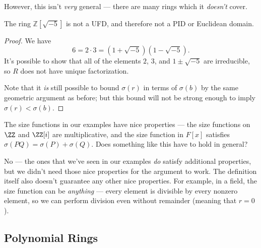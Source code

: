 However, this isn't \emph{very} general --- there are many rings which it \emph{doesn't} cover. 


\begin{example}
    The ring $\mathbb{Z}[\sqrt{-5}]$ is not a UFD, and therefore not a PID or Euclidean domain. 
\end{example}

\begin{proof}
    We have \[6 = 2\cdot 3 = (1 + \sqrt{-5})(1 - \sqrt{-5}).\] It's possible to show that all of the elements $2$, $3$, and $1 \pm \sqrt{-5}$ are irreducible, so $R$ does not have unique factorization.

    Note that it \emph{is} still possible to bound $\sigma(r)$ in terms of $\sigma(b)$ by the same geometric argument as before; but this bound will not be strong enough to imply $\sigma(r) < \sigma(b)$. 
\end{proof}

\begin{question}
The size functions in our examples have nice properties --- the size functions on $\ZZ$ and $\ZZ[i]$ are multiplicative, and the size function in $F[x]$ satisfies $\sigma(PQ) = \sigma(P) + \sigma(Q)$. Does something like this have to hold in general?
\end{question}

\begin{ans}
No --- the ones that we've seen in our examples \emph{do} satisfy additional properties, but we didn't need those nice properties for the argument to work. The definition itself also doesn't guarantee any other nice properties. For example, in a field, the size function can be \emph{anything} --- every element is divisible by every nonzero element, so we can perform division even without remainder (meaning that $r = 0$). 
\end{ans}

\subsection{Polynomial Rings}

